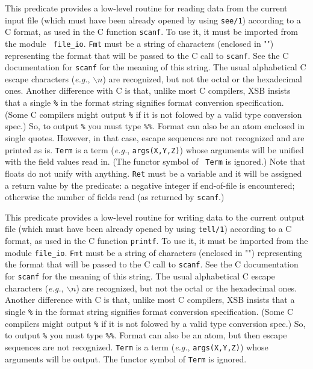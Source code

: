 \begin{description}

    This predicate provides a low-level routine for reading data from
    the current input file (which must have been already opened by using
    {\tt see/1}) according to a C format, as used in the C function
    {\tt scanf}. To use it, it must be imported from the module {\tt
    file\_io}.  {\tt Fmt} must be a string of characters (enclosed in "")
    representing the format that 
    will be passed to the C call to {\tt scanf}.  See the C
    documentation for {\tt scanf} for the meaning of this string.
    The usual alphabetical C escape characters ({\it e.g.}, $\backslash n$)
    are recognized, but not the octal or the hexadecimal ones.
    Another difference with C is that, unlike most C compilers, XSB insists
    that a single {\tt \%} in the format string signifies format conversion
    specification. (Some C compilers might output {\tt \%} if it is not
    folowed by a valid type conversion spec.) So, to output {\tt \%}
    you must type {\tt \%\%}.
    Format can also be an atom enclosed in single quotes. However, in that
    case, escape sequences are not recognized and are printed as is.
    {\tt Term} is a term ({\it e.g.}, {\tt args(X,Y,Z)})  whose arguments
    will be unified with the field values read in.  (The functor symbol of {\tt
    Term} is ignored.)  Note that floats do not unify with anything.
    {\tt Ret} must be a variable and it will be assigned a return value by
    the predicate: a negative integer if end-of-file is encountered;
    otherwise the number of fields read (as returned by {\tt scanf}.)

    This predicate provides a low-level routine for writing data to
    the current output file (which must have been already opened by using
    {\tt tell/1}) according to a C format, as used in the C function
    {\tt printf}.
    To use it, it must be imported from the module {\tt file\_io}.
    {\tt Fmt} must be a string of characters (enclosed in "")
    representing the format that 
    will be passed to the C call to {\tt scanf}.  See the C
    documentation for {\tt scanf} for the meaning of this string.
    The usual alphabetical C escape characters ({\it e.g.}, $\backslash n$)
    are recognized, but not the octal or the hexadecimal ones.
    Another difference with C is that, unlike most C compilers, XSB insists
    that a single {\tt \%} in the format string signifies format conversion
    specification. (Some C compilers might output {\tt \%} if it is not
    folowed by a valid type conversion spec.) So, to output {\tt \%}
    you must type {\tt \%\%}. Format can also be an atom, but then escape
    sequences are not recognized.
    {\tt Term} is a term ({\it e.g.}, {\tt args(X,Y,Z)}) whose arguments
    will be output. 
    The functor symbol of {\tt Term} is ignored.


\end{description}
